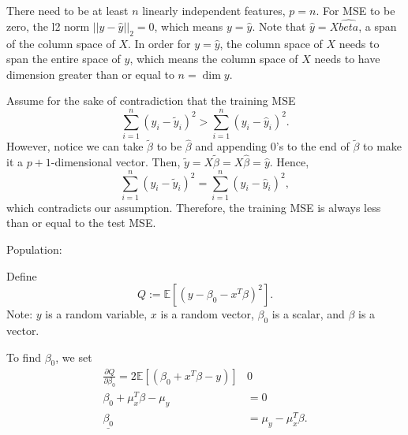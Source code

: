 \documentclass{article}
\begin{document}
There need to be at least $n$ linearly independent features, $p=n$.
For MSE to be zero, the l2 norm $||y - \hat{y}||_2 = 0$, which means $y = \hat{y}$.
Note that $\hat{y} = X \hat{beta}$, a span of the column space of $X$. In order for $y = \hat{y}$, 
the column space of $X$ needs to span the entire space of $y$, which means the column space of $X$ 
needs to have dimension greater than or equal to $n = \dim y$.


Assume for the sake of contradiction that the training MSE 
$$\sum_{i=1}^n (y_i - \tilde{y}_i)^2 > \sum_{i=1}^n (y_i - \hat{y}_i)^2.$$
However, notice we can take $\tilde{\beta}$ to be $\hat{\beta}$ and appending $0$'s to the end of 
$\tilde{\beta}$ to make it a $p+1$-dimensional vector. 
Then, $\tilde{y} = X\tilde{\beta} = X\hat{\beta} = \hat{y}$. Hence, 
$$\sum_{i=1}^n (y_i - \tilde{y}_i)^2 = \sum_{i=1}^n (y_i - \hat{y}_i)^2,$$
which contradicts our assumption. Therefore, the training MSE is always less than or equal to the 
test MSE.











Population:

Define $$Q:=\mathbb{E}\left[(y-\beta_0-x^T\beta)^2\right].$$
Note: $y$ is a random variable, $x$ is a random vector, $\beta_0$ is a scalar, and $\beta$ is a 
vector.

To find $\beta_0$, we set
\begin{align*}
    \frac{\partial Q}{\partial \beta_0} = 2\mathbb{E}\left[(\beta_0+x^T\beta-y)\right] & 0 \\
    \beta_0 + \mu_x^T\beta - \mu_y & = 0 \\
    \underline{\beta_0} & = \mu_y - \mu_x^T\beta.
\end{align*}
\end{document}
